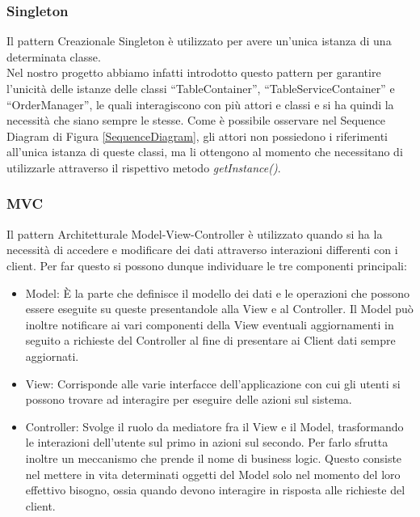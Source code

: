\documentclass{article}
\begin{document}
\newpage

\subsubsection{Singleton}

Il pattern Creazionale Singleton \`e utilizzato per avere un'unica istanza di una determinata classe. \\
Nel nostro progetto abbiamo infatti introdotto questo pattern per garantire l'unicit\`a delle istanze delle classi ``TableContainer'', ``TableServiceContainer'' e ``OrderManager'', le quali interagiscono con pi\`u attori e classi e si ha quindi la necessit\`a che siano sempre le stesse. Come \`e possibile osservare nel Sequence Diagram di Figura \ref{SequenceDiagram}, gli attori non possiedono i riferimenti all'unica istanza di queste classi, ma li ottengono al momento che necessitano di utilizzarle attraverso il rispettivo metodo \textit{getInstance()}.

\subsubsection{MVC}

Il pattern Architetturale Model-View-Controller \`e utilizzato quando si ha la necessit\`a di accedere e modificare dei dati attraverso interazioni differenti con i client. Per far questo si possono dunque individuare le tre componenti principali:

\begin{itemize}
\item Model: \`E la parte che definisce il modello dei dati e le operazioni che possono essere  eseguite su queste presentandole alla View e al Controller. Il Model pu\`o inoltre notificare ai vari componenti della View eventuali aggiornamenti in seguito a richieste del Controller al fine di presentare ai Client dati sempre aggiornati.

\item View: Corrisponde alle varie interfacce dell'applicazione con cui gli utenti si possono trovare ad interagire per eseguire delle azioni sul sistema.
 
\item Controller: Svolge il ruolo da mediatore fra il View e il Model, trasformando le interazioni dell'utente sul primo in azioni sul secondo. Per farlo sfrutta inoltre un meccanismo che prende il nome di business logic. Questo consiste nel mettere in vita determinati oggetti del Model solo nel momento del loro effettivo bisogno, ossia quando devono interagire in risposta alle richieste del client.
\end{itemize}
\end{document}
